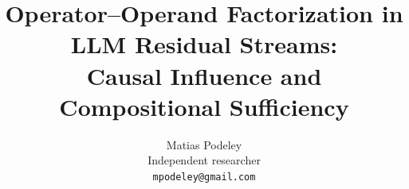 \documentclass[11pt]{article}
\title{Operator--Operand Factorization in LLM Residual Streams:\\Causal Influence and Compositional Sufficiency}
\author{Matias Podeley \\
  Independent researcher \\
  \texttt{mpodeley@gmail.com}}
\begin{document}
\maketitle

\begin{abstract}

\end{abstract}





\onecolumn  %
\appendix

\end{document}
